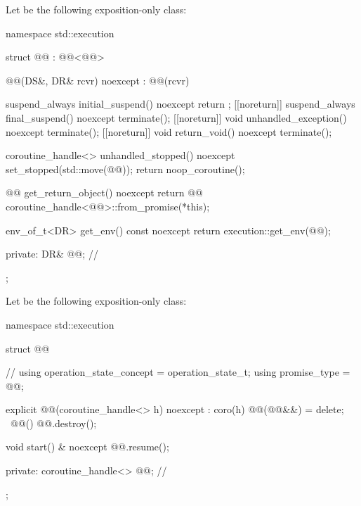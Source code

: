 \pnum
Let  be the following exposition-only class:

\begin{codeblock}
namespace std::execution {
  struct @@ : @@<@@> {

    @@(DS&, DR& rcvr) noexcept : @@(rcvr) {}

    suspend_always initial_suspend() noexcept { return {}; }
    [[noreturn]] suspend_always final_suspend() noexcept { terminate(); }
    [[noreturn]] void unhandled_exception() noexcept { terminate(); }
    [[noreturn]] void return_void() noexcept { terminate(); }

    coroutine_handle<> unhandled_stopped() noexcept {
      set_stopped(std::move(@@));
      return noop_coroutine();
    }

    @@ get_return_object() noexcept {
      return @@{
        coroutine_handle<@@>::from_promise(*this)};
    }

    env_of_t<DR> get_env() const noexcept {
      return execution::get_env(@@);
    }

  private:
    DR& @@;                           // \expos
  };
}
\end{codeblock}

\pnum
Let  be the following exposition-only class:
\begin{codeblock}
namespace std::execution {
  struct @@ {                              // \expos
    using operation_state_concept = operation_state_t;
    using promise_type = @@;

    explicit @@(coroutine_handle<> h) noexcept : coro(h) {}
    @@(@@&&) = delete;
    ~@@() { @@.destroy(); }

    void start() & noexcept {
      @@.resume();
    }

  private:
    coroutine_handle<> @@;                                    // \expos
  };
}
\end{codeblock}

